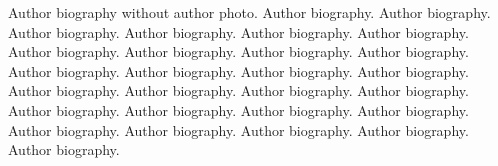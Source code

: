 \documentclass[a4paper,fleqn]{cas-dc}
\begin{document}


\printcredits

%
%






\bio{}
Author biography without author photo.
Author biography. Author biography. Author biography.
Author biography. Author biography. Author biography.
Author biography. Author biography. Author biography.
Author biography. Author biography. Author biography.
Author biography. Author biography. Author biography.
Author biography. Author biography. Author biography.
Author biography. Author biography. Author biography.
Author biography. Author biography. Author biography.
Author biography. Author biography. Author biography.
\endbio

%
\end{document}
